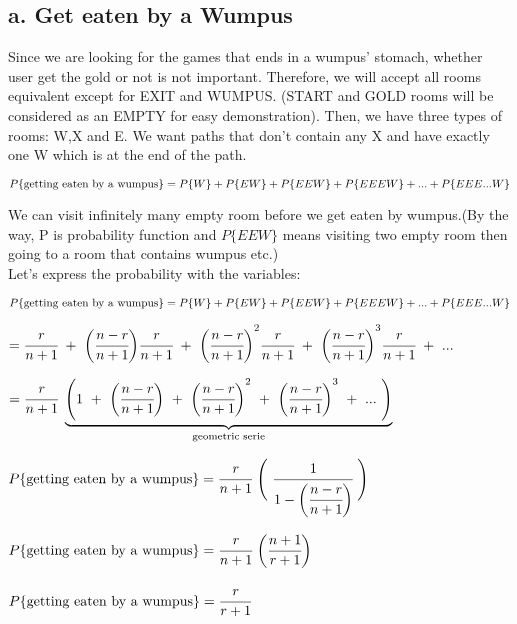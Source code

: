 \documentclass[12pt]{article}
\begin{document}
\subsection*{a. Get eaten by a Wumpus}
Since we are looking for the games that ends in a wumpus' stomach, whether user get the gold or not is not important. Therefore, we will accept all rooms equivalent except for EXIT and WUMPUS. (START and GOLD rooms will be considered as an EMPTY for easy demonstration). Then, we have three types of rooms: W,X and E. We want paths that don't contain any X and have exactly one W which is at the end of the path.\\
\begin{center}
$P\{\textnormal{getting eaten by a wumpus}\}=P\{W\}+P\{EW\}+P\{EEW\}+P\{EEEW\}+ ... +P\{EEE...W\}$
\end{center}
We can visit infinitely many empty room before we get eaten by wumpus.(By the way, P is probability function and $P\{EEW\}$ means visiting two empty room then going to a room that contains wumpus etc.)\\
Let's express the probability with the variables:\\
\begin{center}
$P\{\textnormal{getting eaten by a wumpus}\}=P\{W\}+P\{EW\}+P\{EEW\}+P\{EEEW\}+ ... +P\{EEE...W\}$
\end{center}
\begin{center}
$=\cfrac{r}{n+1}\ +\ \bigg(\cfrac{n-r}{n+1}\bigg)\cfrac{r}{n+1}\ +\ {\bigg(\cfrac{n-r}{n+1}\bigg)}^{2}\cfrac{r}{n+1}\ +\ {\bigg(\cfrac{n-r}{n+1}\bigg)}^{3}\cfrac{r}{n+1}\ +\ ...$
\end{center}
\begin{center}
$=\cfrac{r}{n+1}\ \underbrace{\Bigg({1\ +\ \bigg(\cfrac{n-r}{n+1}\bigg)\ +\ \bigg(\cfrac{n-r}{n+1}\bigg)}^{2}\ +\ {\bigg(\cfrac{n-r}{n+1}\bigg)}^{3}\ +\ ...\ \Bigg)}_\text{geometric serie}$
\end{center}
\begin{center}
$P\{\textnormal{getting eaten by a wumpus}\}=\cfrac{r}{n+1}\ \Bigg(\ \cfrac{1}{1-\bigg(\cfrac{n-r}{n+1}\bigg)}\ \Bigg)$
\end{center}
\begin{center}
$P\{\textnormal{getting eaten by a wumpus}\}=\cfrac{r}{n+1}\ \bigg(\cfrac{n+1}{r+1}\bigg)$
\end{center}
\begin{center}
$P\{\textnormal{getting eaten by a wumpus}\}=\cfrac{r}{r+1}$
\end{center}
\end{document}
